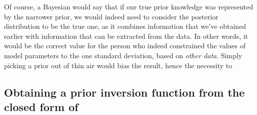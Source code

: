 \documentclass[usenatbib]{mnras}
\begin{document}
Of course, a Bayesian would say that if our true prior knowledge
was represented by the narrower prior, we would indeed need to
consider the posterior distribution to be the true one, as it
combines information that we've obtained earlier with information
that can be extracted from the data. In other words, it would be
the correct value for the person who indeed constrained the values
of model parameters to the one standard deviation, based on \emph{other
data}. Simply picking a prior out of thin air would bias the result, hence the necessity to 



\subsection{Obtaining a prior inversion function from the closed form of}
\label{sec:orgc87e0f1}
\end{document}
